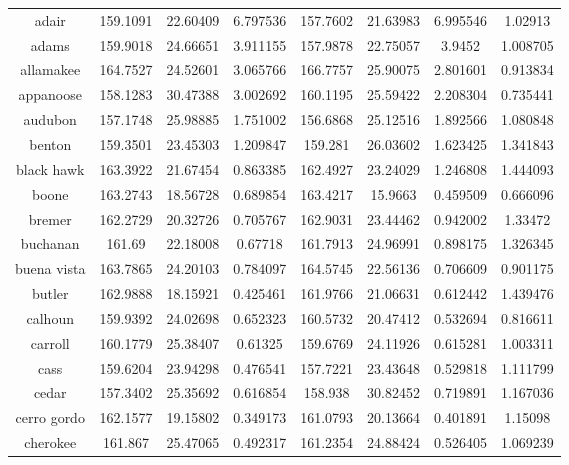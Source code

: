 \begin{table}[H]
\begin{tabular}{|c|ccc|ccc|c|}
adair         & 159.1091 & 22.60409       & 6.797536 & 157.7602 & 21.63983       & 6.995546 & 1.02913  \\
adams         & 159.9018 & 24.66651       & 3.911155 & 157.9878 & 22.75057       & 3.9452   & 1.008705 \\
allamakee     & 164.7527 & 24.52601       & 3.065766 & 166.7757 & 25.90075       & 2.801601 & 0.913834 \\
appanoose     & 158.1283 & 30.47388       & 3.002692 & 160.1195 & 25.59422       & 2.208304 & 0.735441 \\
audubon       & 157.1748 & 25.98885       & 1.751002 & 156.6868 & 25.12516       & 1.892566 & 1.080848 \\
benton        & 159.3501 & 23.45303       & 1.209847 & 159.281  & 26.03602       & 1.623425 & 1.341843 \\
black hawk    & 163.3922 & 21.67454       & 0.863385 & 162.4927 & 23.24029       & 1.246808 & 1.444093 \\
boone         & 163.2743 & 18.56728       & 0.689854 & 163.4217 & 15.9663        & 0.459509 & 0.666096 \\
bremer        & 162.2729 & 20.32726       & 0.705767 & 162.9031 & 23.44462       & 0.942002 & 1.33472  \\
buchanan      & 161.69   & 22.18008       & 0.67718  & 161.7913 & 24.96991       & 0.898175 & 1.326345 \\
buena vista   & 163.7865 & 24.20103       & 0.784097 & 164.5745 & 22.56136       & 0.706609 & 0.901175 \\
butler        & 162.9888 & 18.15921       & 0.425461 & 161.9766 & 21.06631       & 0.612442 & 1.439476 \\
calhoun       & 159.9392 & 24.02698       & 0.652323 & 160.5732 & 20.47412       & 0.532694 & 0.816611 \\
carroll       & 160.1779 & 25.38407       & 0.61325  & 159.6769 & 24.11926       & 0.615281 & 1.003311 \\
cass          & 159.6204 & 23.94298       & 0.476541 & 157.7221 & 23.43648       & 0.529818 & 1.111799 \\
cedar         & 157.3402 & 25.35692       & 0.616854 & 158.938  & 30.82452       & 0.719891 & 1.167036 \\
cerro gordo   & 162.1577 & 19.15802       & 0.349173 & 161.0793 & 20.13664       & 0.401891 & 1.15098  \\
cherokee      & 161.867  & 25.47065       & 0.492317 & 161.2354 & 24.88424       & 0.526405 & 1.069239 \\

\end{tabular}
\end{table}

